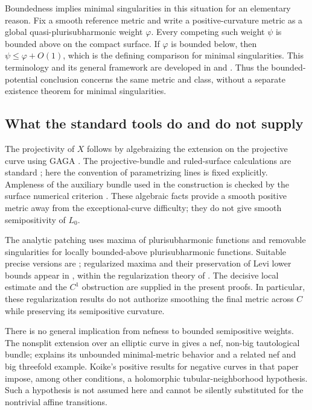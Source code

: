 \documentclass[11pt,a4paper]{article}
\numberwithin{equation}{section}
\theoremstyle{definition}
\theoremstyle{remark}
\begin{document}
Boundedness implies minimal singularities in this situation for an
elementary reason.  Fix a smooth reference metric and write a
positive-curvature metric as a global quasi-plurisubharmonic weight
$\varphi$.  Every competing such weight $\psi$ is bounded above on the
compact surface.  If $\varphi$ is bounded below, then
$\psi\leq\varphi+O(1)$, which is the defining comparison for minimal
singularities.  This terminology and its general framework are developed
in \cite[\S1]{DPS2001} and \cite{BEGZ2010}.  Thus the bounded-potential
conclusion concerns the same metric and class, without a separate
existence theorem for minimal singularities.

\subsection{What the standard tools do and do not supply}
\label{hist:tools}

The projectivity of $X$ follows by algebraizing the extension on the
projective curve using GAGA \cite{Serre1956}.  The projective-bundle and
ruled-surface calculations are standard
\cite[Chapters~II and~V]{Hartshorne1977}; here the convention of
parametrizing lines is fixed explicitly.  Ampleness of the auxiliary bundle
used in the construction is checked by the surface numerical criterion
\cite{Nakai1963,Lazarsfeld2004}.  These algebraic facts provide a smooth
positive metric away from the exceptional-curve difficulty; they do not
give smooth semipositivity of $L_0$.

The analytic patching uses maxima of plurisubharmonic functions and
removable singularities for locally bounded-above plurisubharmonic
functions.  Suitable precise versions are
\cite[Chapter~I, Lemma~5.17 and Theorem~5.24]{DemaillyCADG}; regularized
maxima and their preservation of Levi lower bounds appear in
\cite[Chapter~I, Lemma~5.18]{DemaillyCADG}, within the regularization theory
of \cite{Richberg1968}.  The decisive local estimate and the $C^1$
obstruction are supplied in the present proofs.  In particular, these
regularization results do not authorize smoothing the final metric
across $C$ while preserving its semipositive curvature.

There is no general implication from nefness to bounded semipositive
weights.  The nonsplit extension over an elliptic curve in
\cite[Example~1.7]{DPS1994} gives a nef, non-big tautological bundle;
\cite[Corollary~4.1 and Example~4.2]{Koike2015} explains its unbounded
minimal-metric behavior and a related nef and big threefold example.
Koike's positive results for negative curves in that paper impose, among
other conditions, a holomorphic tubular-neighborhood hypothesis.  Such a
hypothesis is not assumed here and cannot be silently substituted for the
nontrivial affine transitions.
\end{document}
